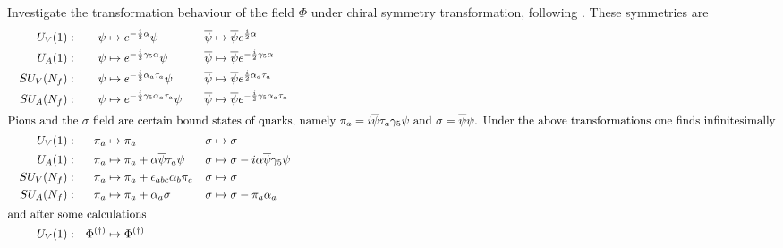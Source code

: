 Investigate the transformation behaviour of the field $\Phi$ under chiral symmetry transformation, following \cite{Koch_1997}. These symmetries are
\begin{subequations}
    \begin{align}
         &  & U_V(1): &  & \psi             & \mapsto e^{-\frac{\imagu}{2}\alpha}\psi                                             &  \overline{\psi}&\mapsto\overline{\psi}e^{\frac{\imagu}{2}\alpha}     &&                              \\
         &  & U_A(1): &  & \psi             & \mapsto e^{-\frac{\imagu}{2}\gamma_5\alpha}\psi                                     &  \overline{\psi}      & \mapsto \overline{\psi}e^{-\frac{\imagu}{2}\gamma_5\alpha} &&                                \\
         &  & SU_V(N_f): &  & \psi             & \mapsto e^{-\frac{\imagu}{2}\alpha_a\tau_a}\psi                                             &  \overline{\psi}&\mapsto\overline{\psi}e^{\frac{\imagu}{2}\alpha_a\tau_a}     &&                              \\
         &  & SU_A(N_f): &  & \psi             & \mapsto e^{-\frac{\imagu}{2}\gamma_5\alpha_a\tau_a}\psi                                     &  \overline{\psi}      & \mapsto \overline{\psi}e^{-\frac{\imagu}{2}\gamma_5\alpha_a\tau_a} &&                                \\
        \intertext{Pions and the $\sigma$ field are certain bound states of quarks, namely $\pi_a=\imagu\overline{\psi}\tau_a\gamma_5\psi$ and $\sigma=\overline{\psi}\psi$. Under the above transformations one finds infinitesimally}
         &  & U_V(1): &  & \pi_a            & \mapsto\pi_a & \sigma & \mapsto\sigma               &  & \\
         &  & U_A(1): &  & \pi_a            & \mapsto\pi_a+\alpha\overline{\psi}\tau_a\psi                                                                & \sigma & \mapsto\sigma-\imagu\alpha\overline{\psi}\gamma_5\psi &  & \\
         &  & SU_V(N_f): &  & \pi_a            & \mapsto\pi_a+\epsilon_{abc}\alpha_b\pi_c                                                    & \sigma & \mapsto\sigma               &  & \\
         &  & SU_A(N_f): &  & \pi_a            & \mapsto\pi_a+\alpha_a\sigma                                                                 & \sigma & \mapsto\sigma-\pi_a\alpha_a &  & \\
        \intertext{and after some calculations}
         &  & U_V(1): &  & \Phi^{(\dagger)} & \mapsto \Phi^{(\dagger)}                                                              \\

\end{align}
\end{subequations}
